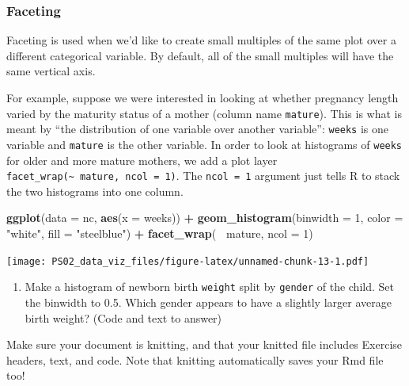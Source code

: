 \documentclass[]{article}
\newenvironment{Shaded}{\begin{snugshade}}{\end{snugshade}}
\newcommand{\DataTypeTok}[1]{\textcolor[rgb]{0.13,0.29,0.53}{#1}}
\newcommand{\DecValTok}[1]{\textcolor[rgb]{0.00,0.00,0.81}{#1}}
\newcommand{\KeywordTok}[1]{\textcolor[rgb]{0.13,0.29,0.53}{\textbf{#1}}}
\newcommand{\NormalTok}[1]{#1}
\newcommand{\OperatorTok}[1]{\textcolor[rgb]{0.81,0.36,0.00}{\textbf{#1}}}
\newcommand{\StringTok}[1]{\textcolor[rgb]{0.31,0.60,0.02}{#1}}
\providecommand{\tightlist}{%
  \setlength{\itemsep}{0pt}\setlength{\parskip}{0pt}}
\begin{document}
\hypertarget{faceting}{%
\subsubsection{Faceting}\label{faceting}}

Faceting is used when we'd like to create small multiples of the same
plot over a different categorical variable. By default, all of the small
multiples will have the same vertical axis.

For example, suppose we were interested in looking at whether pregnancy
length varied by the maturity status of a mother (column name
\texttt{mature}). This is what is meant by ``the distribution of one
variable over another variable'': \texttt{weeks} is one variable and
\texttt{mature} is the other variable. In order to look at histograms of
\texttt{weeks} for older and more mature mothers, we add a plot layer
\texttt{facet\_wrap(\textasciitilde{}\ mature,\ ncol\ =\ 1)}. The
\texttt{ncol\ =\ 1} argument just tells R to stack the two histograms
into one column.

\begin{Shaded}
\begin{Highlighting}[]
\KeywordTok{ggplot}\NormalTok{(}\DataTypeTok{data =}\NormalTok{ nc, }\KeywordTok{aes}\NormalTok{(}\DataTypeTok{x =}\NormalTok{ weeks)) }\OperatorTok{+}
\StringTok{  }\KeywordTok{geom_histogram}\NormalTok{(}\DataTypeTok{binwidth =} \DecValTok{1}\NormalTok{, }\DataTypeTok{color =} \StringTok{"white"}\NormalTok{, }\DataTypeTok{fill =} \StringTok{"steelblue"}\NormalTok{) }\OperatorTok{+}
\StringTok{  }\KeywordTok{facet_wrap}\NormalTok{(}\OperatorTok{~}\StringTok{ }\NormalTok{mature, }\DataTypeTok{ncol =} \DecValTok{1}\NormalTok{)}
\end{Highlighting}
\end{Shaded}

\texttt{[image: PS02\_data\_viz\_files/figure-latex/unnamed-chunk-13-1.pdf]}

\begin{enumerate}
\def\labelenumi{\arabic{enumi}.}
\tightlist
\item
  Make a histogram of newborn birth \texttt{weight} split by
  \texttt{gender} of the child. Set the binwidth to 0.5. Which gender
  appears to have a slightly larger average birth weight? (Code and text
  to answer)
\end{enumerate}

\leavevmode\hypertarget{license}{}%
Make sure your document is knitting, and that your knitted file includes
Exercise headers, text, and code. Note that knitting automatically saves
your Rmd file too!
\end{document}
